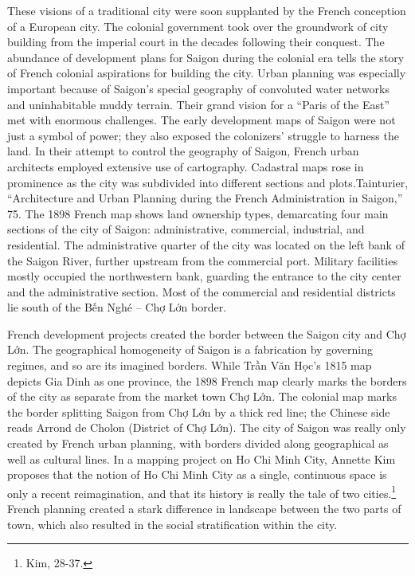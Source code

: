 These visions of a traditional city were soon supplanted by the French conception of a European city. The colonial government took over the groundwork of city building from the imperial court in the decades following their conquest. The abundance of development plans for Saigon during the colonial era tells the story of French colonial aspirations for building the city. Urban planning was especially important because of Saigon’s special geography of convoluted water networks and uninhabitable muddy terrain. Their grand vision for a “Paris of the East” met with enormous challenges. The early development maps of Saigon were not just a symbol of power; they also exposed the colonizers’ struggle to harness the land. In their attempt to control the geography of Saigon, French urban architects employed extensive use of cartography. Cadastral maps rose in prominence as the city was subdivided into different sections and plots.{Tainturier, “Architecture and Urban Planning during the French Administration in Saigon,” 75.} The 1898 French map shows land ownership types, demarcating four main sections of the city of Saigon: administrative, commercial, industrial, and residential. The administrative quarter of the city was located on the left bank of the Saigon River, further upstream from the commercial port. Military facilities mostly occupied the northwestern bank, guarding the entrance to the city center and the administrative section. Most of the commercial and residential districts lie south of the Bến Nghé – Chợ Lớn border.

French development projects created the border between the Saigon city and Chợ Lớn. The geographical homogeneity of Saigon is a fabrication by governing regimes, and so are its imagined borders. While Trần Văn Học’s 1815 map depicts Gia Dinh as one province, the 1898 French map clearly marks the borders of the city as separate from the market town Chợ Lớn. The colonial map marks the border splitting Saigon from Chợ Lớn by a thick red line; the Chinese side reads Arrond de Cholon (District of Chợ Lớn). The city of Saigon was really only created by French urban planning, with borders divided along geographical as well as cultural lines. In a mapping project on Ho Chi Minh City, Annette Kim proposes that the notion of Ho Chi Minh City as a single, continuous space is only a recent reimagination, and that its history is really the tale of two cities.\footnote{Kim, 28-37.} French planning created a stark difference in landscape between the two parts of town, which also resulted in the social stratification within the city.

